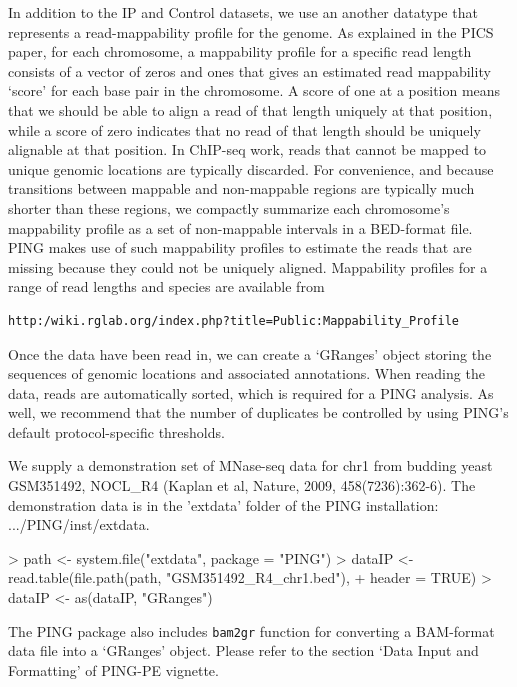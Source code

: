 \documentclass[11pt]{article}
\begin{document}
In addition to the IP and Control datasets, we use an another datatype that represents a read-mappability profile for the genome. 
As explained in the PICS paper, for each chromosome, a mappability profile for a specific read length consists of a vector of zeros and ones that gives an estimated read mappability `score' for each base pair in the chromosome. A score of one at a position means that we should be able to align a read of that length uniquely at that position, while a score of zero indicates that no read of that length should be uniquely alignable at that position. In ChIP-seq work, reads that cannot be mapped to unique genomic locations are typically discarded. For convenience, and because transitions between mappable and non-mappable regions are typically much shorter than these regions, we compactly summarize each chromosome's mappability profile as a set of 
non-mappable intervals in a BED-format file. 
PING makes use of such mappability profiles to estimate the reads that are missing because they could not be uniquely aligned. 
Mappability profiles for a range of read lengths and species are available from \begin{verbatim}
http:/wiki.rglab.org/index.php?title=Public:Mappability_Profile
\end{verbatim}


Once the data have been read in, we can create a `GRanges' object storing the sequences of genomic locations and associated annotations. When reading the data, reads are automatically sorted, which is required for a PING analysis. As well, we recommend that the number of duplicates be controlled by using PING's default protocol-specific thresholds.

We supply a demonstration set of MNase-seq data for chr1 from budding yeast GSM351492, NOCL\_R4 (Kaplan et al, Nature, 2009, 458(7236):362-6). The demonstration data is in the 'extdata' folder of the PING installation:  .../PING/inst/extdata.

\begin{Schunk}
\begin{Sinput}
> path <- system.file("extdata", package = "PING")
> dataIP <- read.table(file.path(path, "GSM351492_R4_chr1.bed"), 
+     header = TRUE)
> dataIP <- as(dataIP, "GRanges")
\end{Sinput}
\end{Schunk}
The PING package also includes \texttt{bam2gr} function for converting a BAM-format data file into a `GRanges' object. Please refer to the section `Data Input and Formatting' of PING-PE vignette.
\end{document}
